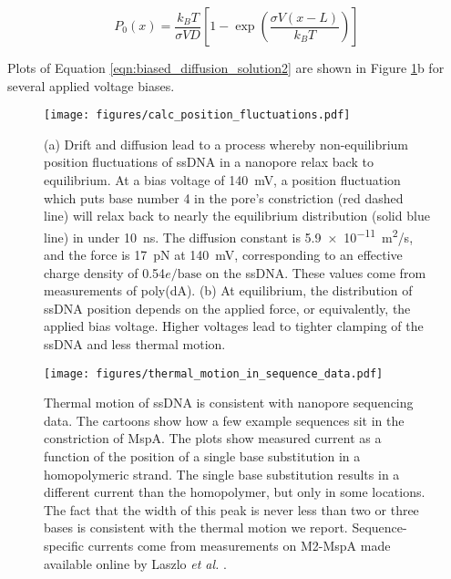 \begin{equation}
P_0(x) = \frac{k_B T}{\sigma V D} \left[ 1 - \exp{ \left( \frac{\sigma V (x-L)}{k_B T} \right) } \right]
\label{eqn:biased_diffusion_solution2}
\end{equation}

Plots of Equation \ref{eqn:biased_diffusion_solution2} are shown in Figure \ref{fig:position_fluctuations}b for several applied voltage biases.

\begin{figure}[h]
\begin{centering}
\texttt{[image: figures/calc\_position\_fluctuations.pdf]}
\caption[Position fluctuations of ssDNA in MspA]{(a) Drift and diffusion lead to a process whereby non-equilibrium position fluctuations of ssDNA in a nanopore relax back to equilibrium.  At a bias voltage of \SI{140}{\mV}, a position fluctuation which puts base number 4 in the pore's constriction (red dashed line) will relax back to nearly the equilibrium distribution (solid blue line) in under \SI{10}{\ns}.  The diffusion constant is \SI{5.9e-11}{\m^2/s}, and the force is \SI{17}{\pico\N} at \SI{140}{\mV}, corresponding to an effective charge density of \num{0.54}$e/\text{base}$ on the ssDNA.  These values come from measurements of poly(dA).  (b) At equilibrium, the distribution of ssDNA position depends on the applied force, or equivalently, the applied bias voltage.  Higher voltages lead to tighter clamping of the ssDNA and less thermal motion.}
\label{fig:position_fluctuations}
\end{centering}
\end{figure}

\begin{figure}[h]
\begin{centering}
\texttt{[image: figures/thermal\_motion\_in\_sequence\_data.pdf]}
\caption[Thermal motion averaging and sequencing data]{Thermal motion of ssDNA is consistent with nanopore sequencing data.  The cartoons show how a few example sequences sit in the constriction of MspA.  The plots show measured current as a function of the position of a single base substitution in a homopolymeric strand.  The single base substitution results in a different current than the homopolymer, but only in some locations.  The fact that the width of this peak is never less than two or three bases is consistent with the thermal motion we report.  Sequence-specific currents come from measurements on M2-MspA made available online by Laszlo \textit{et al.} \citep{Laszlo2014}.}
\label{fig:thermal_motion_sequencing}
\end{centering}
\end{figure}

